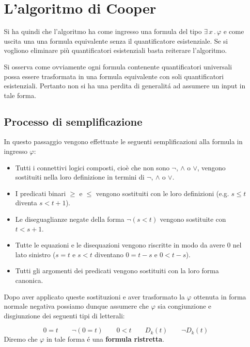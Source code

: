 \documentclass[11pt,letterpaper,twoside]{article}
\begin{document}
\section{L'algoritmo di Cooper}
Si ha quindi che l'algoritmo ha come ingresso una formula del tipo $\exists
\,x \,.\, \varphi$ e come uscita una una formula equivalente senza il
quantificatore esistenziale. Se si vogliono eliminare pi\`u quantificatori
esistenziali basta reiterare l'algoritmo.

Si osserva come ovviamente ogni formula contenente quantificatori universali
possa essere trasformata in una formula equivalente con soli quantificatori
esistenziali.
Pertanto non si ha una perdita di generalit\'a ad assumere un input in tale
forma.

\subsection{Processo di semplificazione}
In questo passaggio vengono effettuate le seguenti semplificazioni alla formula
in ingresso $\varphi$:
\begin{itemize}
\item Tutti i connettivi logici composti, cio\`e che non sono $\lnot$, $\land$ o
  $\lor$, vengono sostituiti nella loro definizione in termini di $\lnot$,
  $\land$ o $\lor$.
\item I predicati binari $\ge$ e $\le$ vengono sostituiti con le loro
  definizioni (e.g. $s \le t$ diventa $s < t + 1$). 
\item Le diseguaglianze negate della forma $\lnot (s < t)$ vengono sostituite
  con $t < s + 1$.
\item Tutte le equazioni e le disequazioni vengono riscritte in modo da avere
  $0$ nel lato sinistro ($s=t$ e $s<t$ diventano $0=t-s$ e $0<t-s$).
\item Tutti gli argomenti dei predicati vengono sostituiti con la loro forma
  canonica.
\end{itemize}
Dopo aver applicato queste sostituzioni e aver trasformato la $\varphi$ ottenuta
in forma normale negativa possiamo dunque assumere che $\varphi$ sia
congiunzione e disgiunzione dei seguenti tipi di letterali:

$$0=t \qquad \lnot(0=t) \qquad 0<t \qquad D_k(t) \qquad \lnot D_k(t)$$
Diremo che $\varphi$ in tale forma \'e una \textbf{formula ristretta}.
\end{document}
